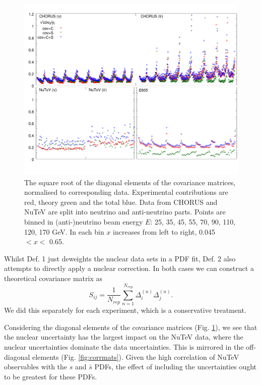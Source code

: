 \begin{figure}
  \centering
  \includegraphics[width=\textwidth]{nuclear/covimpact1.jpg}
    \caption{ The square root of the diagonal elements of the covariance matrices, normalised to corresponding data. Experimental contributions are red, theory green and the total blue. Data from CHORUS and NuTeV are split into neutrino and anti-neutrino parts. Points are binned in (anti-)neutrino beam energy $E$: 25, 35, 45, 55, 70, 90, 110, 120, 170 GeV. In each bin $x$ increases from left to right, 0.045 $< x <$ 0.65.\label{fig:diagcovmat}}
\end{figure}

Whilst Def. 1 just deweights the nuclear data sets in a PDF fit, Def. 2 also attempts to directly apply a nuclear correction. In both cases we can construct a theoretical covariance matrix as
\begin{equation}
S_{ij} = \frac{1}{N_{rep}} \sum_{n=1}^{N_{rep}} \Delta_i^{(n)} \Delta_j^{(n)}.
\end{equation}
We did this separately for each experiment, which is a conservative treatment.

Considering the diagonal elements of the covariance matrices (Fig. \ref{fig:diagcovmat}), we see that the nuclear uncertainty has the largest impact on the NuTeV data, where the nuclear uncertainties dominate the data uncertainties. This is mirrored in the off-diagonal elements (Fig. \ref{fig:corrmats}). Given the high correlation of NuTeV observables with the $s$ and $\bar{s}$ PDFs, the effect of including the uncertainties ought to be greatest for these PDFs.
%
